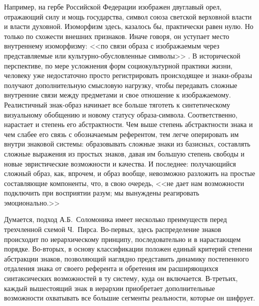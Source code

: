 Например, на гербе Российской Федерации изображен двуглавый орел,
отражающий силу и мощь государства, символ союза светской верховной власти  и власти духовной.
Изоморфизм здесь, казалось бы, практически равен нулю. Но только по
схожести внешних признаков. Иначе говоря, он уступает место внутреннему изоморфизму:
<<по связи образа с изображаемым через представляемые или культурно-обусловленные
символы>> \autocite[][61]{solomonik1995}. В исторической перспективе, по мере
усложнения форм социокультурной практики жизни, человеку уже недостаточно просто
регистрировать происходящее и знаки-образы получают дополнительную смысловую нагрузку,
чтобы передавать сложные внутренние связи между предметами и свое отношение к изображаемому.
Реалистичный знак-образ начинает все больше тяготеть к синтетическому визуальному обобщению
и новому статусу образа-символа. Соответственно, нарастает и степень его абстрактности.
Чем выше степень абстрактности знака и чем слабее его связь с обозначаемым
референтом, тем легче оперировать им внутри знаковой системы: образовывать
сложные знаки из базисных, составлять сложные выражения из простых знаков, давая
им большую степень свободы и новые эвристические возможности и качества.
И последнее: получающийся сложный образ, как,  впрочем,  и образ вообще, невозможно
разложить на простые составляющие компоненты, что, в свою очередь, <<не дает нам
возможности подключить при восприятии разум; мы вынуждены реагировать
эмоционально.>> \autocite[][77]{solomonik1995}

Думается, подход А.Б.~Соломоника имеет несколько преимуществ перед трехчленной
схемой Ч.~Пирса. Во-первых, здесь распределение знаков происходит по
иерархическому принципу, последовательно и в нарастающем порядке. Во-вторых,
в основу классификации положен единый критерий степени абстракции знаков,
позволяющий наглядно представить динамику постепенного отдаления знака от
своего референта и обретения им расширяющихся синтаксических возможностей в ту
систему, куда он включается. В-третьих, каждый вышестоящий знак в иерархии
приобретает дополнительные возможности охватывать все большие сегменты реальности,
которые он шифрует.

